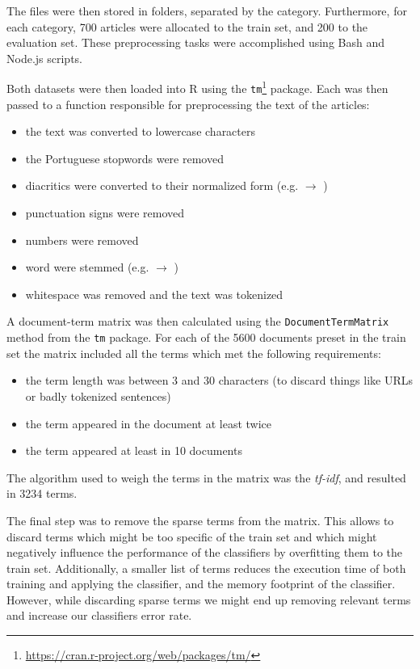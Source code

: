 \documentclass[conference]{IEEEtran}
\begin{document}
The files were then stored in folders, separated by the category.
Furthermore, for each category, 700 articles were allocated to the
train set, and 200 to the evaluation set. These preprocessing tasks
were accomplished using Bash and Node.js scripts.

Both datasets were then loaded into R using the
\texttt{tm}\footnote{\url{https://cran.r-project.org/web/packages/tm/}}
package. Each was then passed to a function responsible for
preprocessing the text of the articles:

\begin{itemize}
    \item the text was converted to lowercase characters
    \item the Portuguese stopwords were removed
    \item diacritics were converted to their normalized form (e.g.
         $\rightarrow$ )
    \item punctuation signs were removed
    \item numbers were removed
    \item word were stemmed (e.g.  $\rightarrow$
        )
    \item whitespace was removed and the text was tokenized
\end{itemize}

A document-term matrix was then calculated using the
\texttt{DocumentTermMatrix} method from the \texttt{tm} package.
For each of the 5600 documents preset in the train set the matrix
included all the terms which met the following requirements:

\begin{itemize}
    \item the term length was between 3 and 30 characters (to discard
        things like URLs or badly tokenized sentences)
    \item the term appeared in the document at least twice
    \item the term appeared at least in 10 documents
\end{itemize}
The algorithm used to weigh the terms in the matrix was the
\textit{tf-idf}, and resulted in 3234 terms.


The final step was to remove the sparse terms from the matrix.
This allows to discard terms which might be too specific of the train
set and which might negatively influence the performance of the
classifiers by overfitting them to the train set. Additionally, a
smaller list of terms reduces the execution time of both training and
applying the classifier, and the memory footprint of the classifier.
However, while discarding sparse terms we might end up removing
relevant terms and increase our classifiers error rate.
\end{document}
